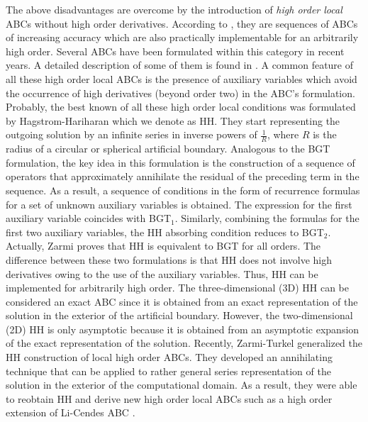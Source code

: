 \documentclass[final,3p,times,12pt]{elsarticle}
\begin{document}
The above disadvantages are overcome by the introduction of {\it high order local} ABCs without high order derivatives. According to \cite {GivoliReview2}, they are sequences of ABCs of increasing accuracy which are also practically implementable for an arbitrarily high order. 
Several ABCs have been formulated within this category in recent years. A detailed description of some of them is found in \cite {GivoliReview2}. A common feature of all these high order local ABCs is the presence of auxiliary variables which avoid the occurrence of high derivatives (beyond order two) in the ABC's formulation. Probably, the best known of all these high order local conditions was formulated by Hagstrom-Hariharan \cite{Hagstrom98} which we denote as HH. They start representing the outgoing solution by an infinite series in inverse powers of $\frac{1}{R}$, where $R$ is the radius of a circular or spherical artificial boundary. 
Analogous to the BGT formulation, the key idea in this formulation is the construction of a sequence of operators that approximately annihilate the residual of the preceding term in the sequence. As a result, a sequence of conditions in the form of recurrence formulas for a set of unknown auxiliary variables is obtained. The expression for the first auxiliary variable coincides with BGT$_1$. Similarly, combining the formulas for the first two auxiliary variables, the HH absorbing condition reduces to BGT$_2$. Actually, Zarmi \cite{ZarmiThesis} proves that HH is equivalent to BGT for all orders. The difference between these two formulations is that HH does not involve high derivatives owing to the use of the auxiliary variables. Thus, HH can be implemented for arbitrarily high order. The three-dimensional (3D) HH can be considered an exact ABC since it is obtained from an exact representation of the solution in the exterior of the artificial boundary. However, the two-dimensional (2D) HH is only asymptotic because it is obtained from an asymptotic expansion of the exact representation of the solution. Recently, Zarmi-Turkel \cite{Zarmi-Turkel} generalized the HH construction of local high order ABCs. They developed an annihilating technique that can be applied to rather general series representation of the solution in the exterior of the computational domain.  As a result, they were able to reobtain HH and derive new high order local ABCs such as a high order extension of Li-Cendes ABC \cite{Li-Cendes}. 
\end{document}
